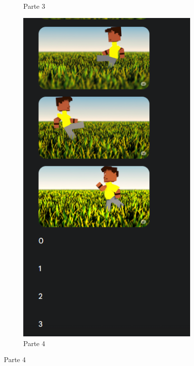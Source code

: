 \begin{figure}[htbp]
\begin{subfigure}{0.3\linewidth}
        \caption{\small Parte 3}
        \label{fig:geminiProSheet5_1c}
    \end{subfigure}\hfill
    \begin{subfigure}{0.3\linewidth}
        \includegraphics[width=1\linewidth]{figs/geminiPro/chat10/tela1_res1_4.PNG}
        \caption{\small Parte 4}
        \label{fig:geminiProSheet5_1d}
    \end{subfigure}\hfill

\end{figure}

